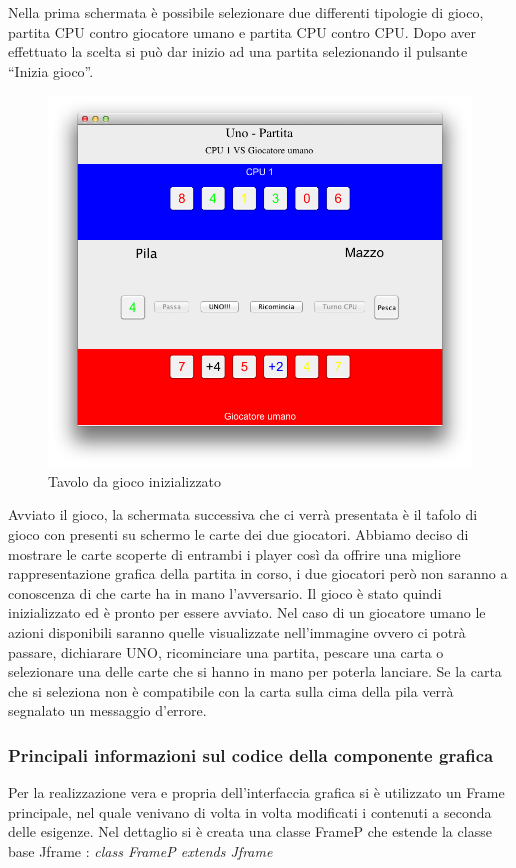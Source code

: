 		Nella prima schermata è possibile selezionare due differenti tipologie di gioco, partita CPU contro giocatore umano e partita CPU contro CPU. Dopo aver effettuato la scelta si può dar inizio ad una partita selezionando il pulsante “Inizia gioco”. 
		
		\begin{figure}[h]
			\centering
			\includegraphics[scale=0.6]{2.png}
			\caption{Tavolo da gioco inizializzato}
			\label{fig2}
		\end{figure}
		
		Avviato il gioco, la schermata successiva che ci verrà presentata è il tafolo di gioco con presenti su schermo le carte dei due giocatori. Abbiamo deciso di mostrare le carte scoperte di entrambi i player così da offrire una migliore rappresentazione grafica della partita in corso, i due giocatori però non saranno a conoscenza di che carte ha in mano l’avversario. Il gioco è stato quindi inizializzato ed è pronto per essere avviato. Nel caso di un giocatore umano le azioni disponibili saranno quelle visualizzate nell’immagine ovvero ci potrà passare, dichiarare UNO, ricominciare una partita, pescare una carta o selezionare una delle carte che si hanno in mano per poterla lanciare. Se la carta che si seleziona non è compatibile con la carta sulla cima della pila verrà segnalato un messaggio d’errore.
		
		\subsubsection{Principali informazioni sul codice della componente grafica}
			Per la realizzazione vera e propria dell'interfaccia grafica si è utilizzato un Frame principale, nel quale venivano di volta in volta modificati i contenuti a seconda delle esigenze. Nel dettaglio si è creata una classe FrameP che estende la classe base Jframe : \textit{class FrameP extends Jframe}\\\\
			
